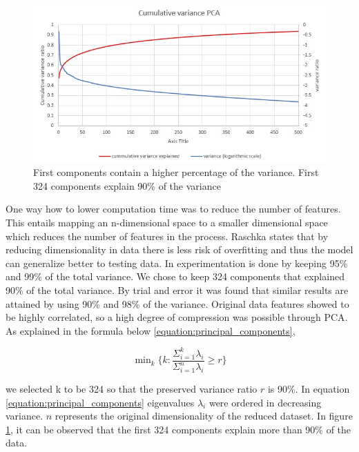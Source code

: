 \documentclass[12pt, a4paper]{report}
\theoremstyle{definition}
\theoremstyle{definition}%
\theoremstyle{definition}%
\theoremstyle{definition}%
\theoremstyle{definition}%
\theoremstyle{definition}%
\begin{document}
\begin{figure}[h]	
	\includegraphics[scale=0.8]{cumulative_variance_pca.jpg}
	\centering
	\caption[PCA first k components cumulative variance]{First components contain a higher percentage of the variance. First 324 components explain 90\% of the variance }
	\label{fig:cumulative_variance_pca}
\end{figure}

One way how to lower computation time was to reduce the number of features. This entails mapping an n-dimensional space to a smaller dimensional space which reduces the number of features in the process. Raschka  \cite{raschka2015python} states that by reducing dimensionality in data there is less risk of overfitting and thus the model can generalize better to testing data.  In \cite{Yang2004} experimentation is done by keeping 95\% and 99\% of the total variance. We chose to keep 324 components that explained 90\% of the total variance. By trial and error it was found that similar results are attained by using 90\% and 98\% of the variance. Original data features showed to be highly correlated, so a high degree of compression was possible through PCA. As explained in the formula below \ref{equation:principal_components},


\begin{equation} \label{equation:principal_components}
 \mathop{\text{min}}_k \Bigg\{ k : \frac{{\Sigma }_{i=1}^{k} \lambda_i}{{\Sigma }_{i=1}^{n}\lambda_i} \geq r \Bigg\}
\end{equation}

we selected k to be 324 so that the preserved variance ratio $r$ is 90\%. In equation \ref{equation:principal_components} eigenvalues $\lambda_i$ were ordered in decreasing variance. $n$ represents the original dimensionality of the reduced dataset. In figure \ref{fig:cumulative_variance_pca}, it can be observed that the first 324 components explain more than 90\% of the data.
\end{document}
